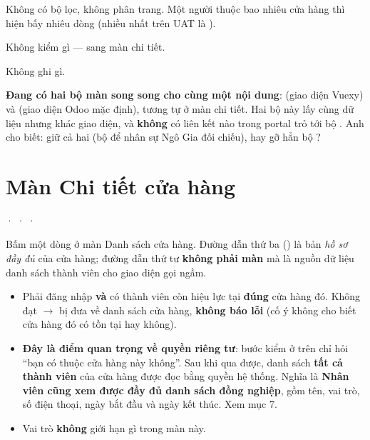 \mloc

Không có bộ lọc, không phân trang. Một người thuộc bao nhiêu cửa hàng thì hiện bấy nhiêu dòng
(nhiều nhất trên UAT là ).


Không kiểm gì --- sang màn chi tiết.

\mghi

Không ghi gì.

\mhoi

\begin{ask}
\textbf{Đang có hai bộ màn song song cho cùng một nội dung}:  (giao diện
Vuexy) và  (giao diện Odoo mặc định), tương tự ở màn chi tiết. Hai bộ này lấy
cùng dữ liệu nhưng khác giao diện, và \textbf{không} có liên kết nào trong portal trỏ tới bộ
. Anh cho biết: giữ cả hai (bộ  để nhân sự Ngô Gia đối chiếu), hay gỡ
hẳn bộ ? 
\end{ask}

\section{Màn Chi tiết cửa hàng}
 ·  ·
 ·
\medskip

\mvao

Bấm một dòng ở màn Danh sách cửa hàng. Đường dẫn thứ ba () là bản \emph{hồ sơ đầy
đủ} của cửa hàng; đường dẫn thứ tư \textbf{không phải màn} mà là nguồn dữ liệu danh sách thành
viên cho giao diện gọi ngầm.

\mai

\begin{itemize}[leftmargin=*]
  \item Phải đăng nhập \textbf{và} có thành viên còn hiệu lực tại \textbf{đúng} cửa hàng đó.
        Không đạt $\rightarrow$ bị đưa về danh sách cửa hàng, \textbf{không báo lỗi} (cố ý
        không cho biết cửa hàng đó có tồn tại hay không).
  \item \textbf{Đây là điểm quan trọng về quyền riêng tư}: bước kiểm ở trên chỉ hỏi ``bạn có
        thuộc cửa hàng này không''. Sau khi qua được, danh sách \textbf{tất cả thành viên} của
        cửa hàng được đọc bằng quyền hệ thống. Nghĩa là \textbf{Nhân viên cũng xem được đầy đủ
        danh sách đồng nghiệp}, gồm tên, vai trò, số điện thoại, ngày bắt đầu và ngày kết thúc.
        Xem mục 7.
  \item Vai trò \textbf{không} giới hạn gì trong màn này.
\end{itemize}

